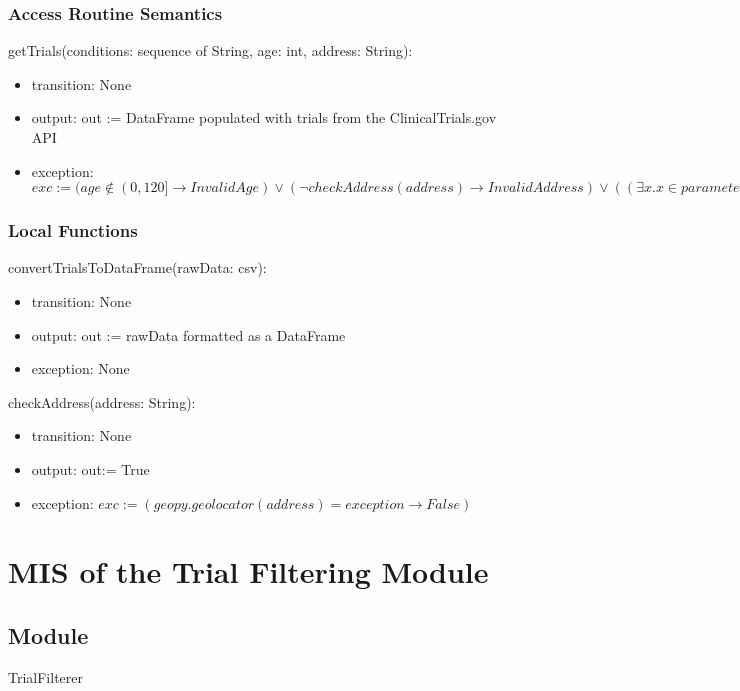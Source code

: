 \documentclass[12pt, titlepage]{article}
\begin{document}
\subsubsection{Access Routine Semantics}

\noindent getTrials(conditions: sequence of String, age: int, address: String):
\begin{itemize}
\item transition: None
\item output: out := DataFrame populated with trials from the ClinicalTrials.gov API
\item exception: $exc := (age \notin (0,120] \rightarrow InvalidAge) \lor (\neg checkAddress(address) \rightarrow InvalidAddress) \lor ((\exists x . x \in parameters : x = \varepsilon) \rightarrow MissingParameter)$
\end{itemize}

\subsubsection{Local Functions}
\noindent convertTrialsToDataFrame(rawData: csv):
\begin{itemize}
\item transition: None
\item output: out := rawData formatted as a DataFrame
\item exception: None
\end{itemize}

\noindent checkAddress(address: String):
\begin{itemize}
\item transition: None
\item output: out:= True
\item exception: $exc := (geopy.geolocator(address) = exception \rightarrow False)$
\end{itemize}


\section{MIS of the Trial Filtering Module} \label{TrialFilterer}

\subsection{Module}

TrialFilterer
\end{document}

